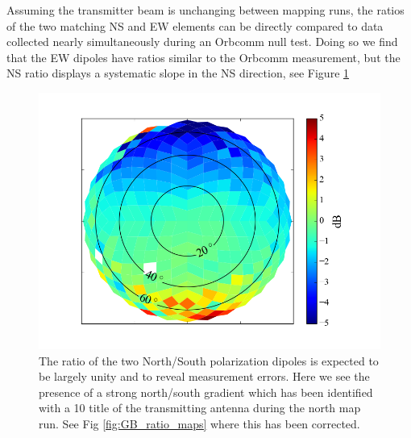 \documentclass[preprint2,numberedappendix,tighten,twocolappendix]{aastex6}
\begin{document}
Assuming the transmitter beam is unchanging between mapping runs, the ratios of the two matching NS and EW elements can be directly compared to data collected nearly simultaneously during an Orbcomm null test.   Doing so we find that the EW dipoles have ratios similar to the Orbcomm measurement, but the NS ratio displays a systematic slope in the NS direction, see Figure \ref{fig:GB_NS_ratio_uncalibrated}
\begin{figure}
\includegraphics[width=\columnwidth]{figures/GB_NS_ratio_uncalibrated.png}
\caption{The ratio of the two North/South polarization dipoles is expected to be largely unity and to reveal measurement errors. Here we see the presence of a strong north/south gradient which has been identified with a 10\arcdeg{} title of the transmitting antenna during the north map run. See Fig \ref{fig:GB_ratio_maps} where this has been corrected. }\label{fig:GB_NS_ratio_uncalibrated}
\end{figure}
\end{document}
